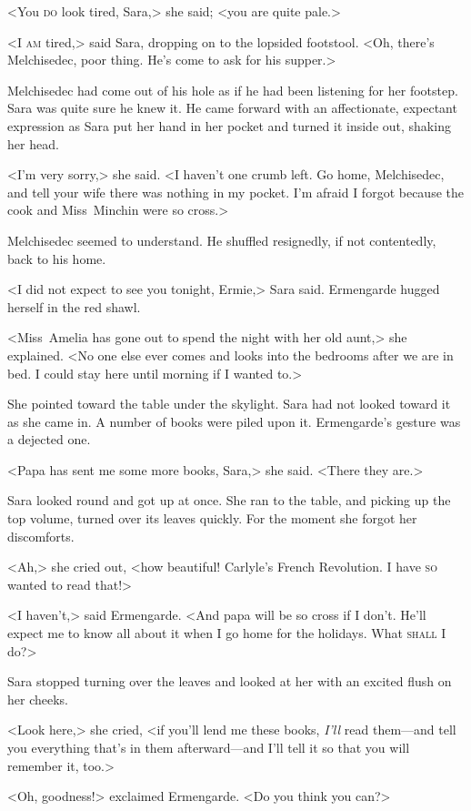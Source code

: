 <You \textsc{do} look tired, Sara,> she said; <you are quite pale.>

<I \textsc{am} tired,> said Sara, dropping on to the lopsided footstool. <Oh, there's Melchisedec, poor thing. He's come to ask for his supper.>

Melchisedec had come out of his hole as if he had been listening for her footstep. Sara was quite sure he knew it. He came forward with an affectionate, expectant expression as Sara put her hand in her pocket and turned it inside out, shaking her head.

<I'm very sorry,> she said. <I haven't one crumb left. Go home, Melchisedec, and tell your wife there was nothing in my pocket. I'm afraid I forgot because the cook and Miss~Minchin were so cross.>

Melchisedec seemed to understand. He shuffled resignedly, if not contentedly, back to his home.

<I did not expect to see you tonight, Ermie,> Sara said. Ermengarde hugged herself in the red shawl.

<Miss~Amelia has gone out to spend the night with her old aunt,> she explained. <No one else ever comes and looks into the bedrooms after we are in bed. I could stay here until morning if I wanted to.>

She pointed toward the table under the skylight. Sara had not looked toward it as she came in. A number of books were piled upon it. Ermengarde's gesture was a dejected one.

<Papa has sent me some more books, Sara,> she said. <There they are.>

Sara looked round and got up at once. She ran to the table, and picking up the top volume, turned over its leaves quickly. For the moment she forgot her discomforts.

<Ah,> she cried out, <how beautiful! Carlyle's French Revolution. I have \textsc{so} wanted to read that!>

<I haven't,> said Ermengarde. <And papa will be so cross if I don't. He'll expect me to know all about it when I go home for the holidays. What \textsc{shall} I do?>

Sara stopped turning over the leaves and looked at her with an excited flush on her cheeks.

<Look here,> she cried, <if you'll lend me these books, \textit{I'll} read them—and tell you everything that's in them afterward—and I'll tell it so that you will remember it, too.>

<Oh, goodness!> exclaimed Ermengarde. <Do you think you can?>

